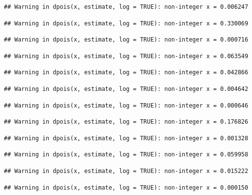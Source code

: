 \documentclass[]{article}
\begin{document}
\begin{verbatim}
## Warning in dpois(x, estimate, log = TRUE): non-integer x = 0.006247
\end{verbatim}

\begin{verbatim}
## Warning in dpois(x, estimate, log = TRUE): non-integer x = 0.330069
\end{verbatim}

\begin{verbatim}
## Warning in dpois(x, estimate, log = TRUE): non-integer x = 0.000716
\end{verbatim}

\begin{verbatim}
## Warning in dpois(x, estimate, log = TRUE): non-integer x = 0.063549
\end{verbatim}

\begin{verbatim}
## Warning in dpois(x, estimate, log = TRUE): non-integer x = 0.042866
\end{verbatim}

\begin{verbatim}
## Warning in dpois(x, estimate, log = TRUE): non-integer x = 0.004642
\end{verbatim}

\begin{verbatim}
## Warning in dpois(x, estimate, log = TRUE): non-integer x = 0.000646
\end{verbatim}

\begin{verbatim}
## Warning in dpois(x, estimate, log = TRUE): non-integer x = 0.176826
\end{verbatim}

\begin{verbatim}
## Warning in dpois(x, estimate, log = TRUE): non-integer x = 0.001328
\end{verbatim}

\begin{verbatim}
## Warning in dpois(x, estimate, log = TRUE): non-integer x = 0.059958
\end{verbatim}

\begin{verbatim}
## Warning in dpois(x, estimate, log = TRUE): non-integer x = 0.015222
\end{verbatim}

\begin{verbatim}
## Warning in dpois(x, estimate, log = TRUE): non-integer x = 0.000150
\end{verbatim}
\end{document}
